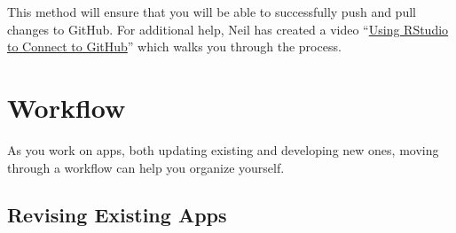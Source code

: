 \documentclass[
]{book}
\begin{document}
This method will ensure that you will be able to successfully push and pull changes to GitHub. For additional help, Neil has created a video ``\href{https://youtu.be/IK0SiEz5vjs}{Using RStudio to Connect to GitHub}'' which walks you through the process.

\hypertarget{workflow}{%
\chapter{Workflow}\label{workflow}}

As you work on apps, both updating existing and developing new ones, moving through a workflow can help you organize yourself.

\hypertarget{revising-existing-apps}{%
\section{Revising Existing Apps}\label{revising-existing-apps}}
\end{document}
